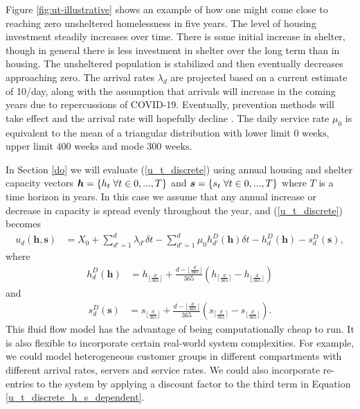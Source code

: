 \documentclass{article}
\begin{document}
Figure \ref{fig:ut-illustrative} shows an example of how one might come close to reaching zero unsheltered homelessness in five years.  The level of housing investment steadily increases over time.  There is some initial increase in shelter, though in general there is less investment in shelter over the long term than in housing.  The unsheltered population is stabilized and then eventually decreases approaching zero.  The arrival rates $\lambda_d$ are projected based on a current estimate of 10/day, along with the assumption that arrivals will increase in the coming years due to repercussions of COVID-19.  Eventually, prevention methods will take effect and the arrival rate will hopefully decline \citep{hometogether2022}. The daily service rate $\mu_0$ is equivalent to the mean of a triangular distribution with lower limit $0 \text{ weeks}$, upper limit $400 \text{ weeks}$ and mode $300 \text{ weeks}$. \newline

In Section \ref{do} we will evaluate (\ref{u_t_discrete}) using annual housing and shelter capacity vectors $\boldsymbol{h} = \{h_t \hspace{0.1cm} \forall t \in 0,...,T\}$ and $\boldsymbol{s} = \{s_t \hspace{0.1cm} \forall t \in 0,...,T\}$ where $T$ is a time horizon in years. In this case we assume that any annual increase or decrease in capacity is spread evenly throughout the year, and (\ref{u_t_discrete}) becomes
%
\begin{align} \label{u_t_discrete_h_s_dependent}
u_d(\boldsymbol{h},\boldsymbol{s}) & = X_0 + \sum_{d'=1}^{d} \lambda_{d'} \delta t - \sum_{d'=1}^{d} \mu_0 h^D_{d'}(\boldsymbol{h}) \delta t - h^D_d(\boldsymbol{h}) - s^D_d(\boldsymbol{s}),
\end{align}
%
where 
%
\begin{align} \label{h_d}
h^D_d(\boldsymbol{h}) & = h_{\lfloor{\frac{d}{365}}\rfloor} + \frac{d-\lfloor\frac{d}{365}\rfloor}{365}(h_{\lceil{\frac{d}{365}}\rceil}-h_{\lfloor{\frac{d}{365}}\rfloor})
\end{align}
%
and
%
\begin{align} \label{s_d}
s^D_d(\boldsymbol{s}) & = s_{\lfloor{\frac{d}{365}}\rfloor} + \frac{d-\lfloor\frac{d}{365}\rfloor}{365}(s_{\lceil{\frac{d}{365}}\rceil}-s_{\lfloor{\frac{d}{365}}\rfloor}).
\end{align}
%
This fluid flow model has the advantage of being computationally cheap to run. It is also flexible to incorporate certain real-world system complexities. For example, we could model heterogeneous customer groups in different compartments with different arrival rates, servers and service rates. We could also incorporate re-entries to the system by applying a discount factor to the third term in Equation \ref{u_t_discrete_h_s_dependent}.
\end{document}
